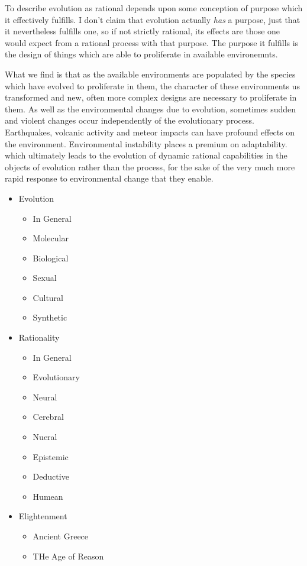 To describe evolution as rational depends upon some conception of purpose which it effectively fulfills.
I don't claim that evolution actually \emph{has} a purpose, just that it nevertheless fulfills one, so if not strictly rational, its effects are those one would expect from a rational process with that purpose.
The purpose it fulfills is the design of things which are able to proliferate in available environemnts.

What we find is that as the available environments are populated by the species which have evolved to proliferate in them, the character of these environments us transformed and new, often more complex designs are necessary to proliferate in them.
As well as the environmental changes due to evolution, sometimes sudden and violent changes occur independently of the evolutionary process.
Earthquakes, volcanic activity and meteor impacts can have profound effects on the environment.
Environmental instability places a premium on adaptability. which ultimately leads to the evolution of dynamic rational capabilities in the objects of evolution rather than the process, for the sake of the very much more rapid response to environmental change that they enable.


\begin{itemize}
\item Evolution
\begin{itemize}
\item In General
\item Molecular
\item Biological
\item Sexual
\item Cultural
\item Synthetic
\end{itemize}
\item Rationality
\begin{itemize}
\item In General
\item Evolutionary
\item Neural
\item Cerebral
\item Nueral
\item Epistemic
\item Deductive
\item Humean
\end{itemize}
\item Elightenment
\begin{itemize}
\item Ancient Greece
\item THe Age of Reason
\end{itemize}
\end{itemize}
